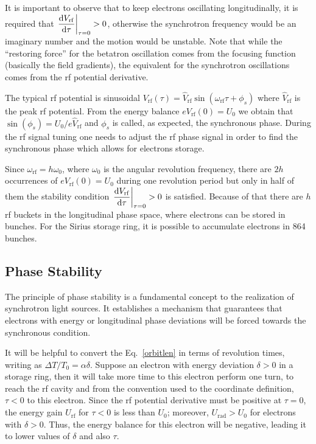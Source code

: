 It is important to observe that to keep electrons oscillating longitudinally, it is required that $\left.\dfrac{\mathrm{d} V_{\mathrm{rf}}}{\mathrm{d} \tau}\right|_{\tau = 0} > 0$, otherwise the synchrotron frequency would be an imaginary number and the motion would be unstable. Note that while the ``restoring force'' for the betatron oscillation comes from the focusing function (basically the field gradients), the equivalent for the synchrotron oscillations comes from the \gls{rf} potential derivative.

The typical \gls{rf} potential is sinusoidal $V_{\mathrm{rf}}(\tau) = \hat{V}_{\mathrm{rf}} \sin \left(\omega_{\mathrm{rf}}\tau + \phi_s\right)$ where $\hat{V}_{\mathrm{rf}}$ is the peak \gls{rf} potential. From the energy balance $eV_{\mathrm{rf}}(0) = U_0$ we obtain that $\sin(\phi_s) = U_0/e\hat{V}_{\mathrm{rf}}$ and $\phi_s$ is called, as expected, the synchronous phase. During the \gls{rf} signal tuning one needs to adjust the \gls{rf} phase signal in order to find the synchronous phase which allows for electrons storage.

Since $\omega_{\mathrm{rf}} = h \omega_0$, where $\omega_0$ is the angular revolution frequency, there are $2h$ occurrences of $eV_{\mathrm{rf}}(0) = U_0$ during one revolution period but only in half of them the stability condition $\left.\dfrac{\mathrm{d} V_{\mathrm{rf}}}{\mathrm{d} \tau}\right|_{\tau = 0} > 0$ is satisfied. Because of that there are $h$ \gls{rf} buckets in the longitudinal phase space, where electrons can be stored in bunches. For the Sirius storage ring, it is possible to accumulate electrons in 864 bunches.
\subsection{Phase Stability}
The principle of phase stability is a fundamental concept to the realization of synchrotron light sources. It establishes a mechanism that guarantees that electrons with energy or longitudinal phase deviations will be forced towards the synchronous condition.

It will be helpful to convert the Eq.~\eqref{orbitlen} in terms of revolution times, writing as $\Delta T/T_0 = \alpha \delta$. Suppose an electron with energy deviation $\delta > 0$ in a storage ring, then it will take more time to this electron perform one turn, to reach the \gls{rf} cavity and from the convention used to the coordinate definition, $\tau < 0$ to this electron. Since the \gls{rf} potential derivative must be positive at $\tau = 0$, the energy gain $U_{\mathrm{rf}}$ for $\tau < 0$ is less than $U_0$; moreover, $U_{\mathrm{rad}} > U_0$ for electrons with $\delta > 0$. Thus, the energy balance for this electron will be negative, leading it to lower values of $\delta$ and also $\tau$.

